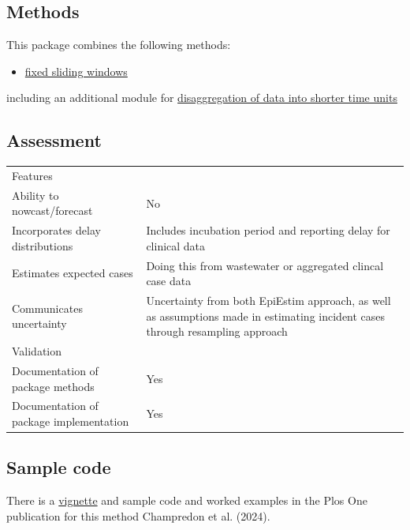 \documentclass[
  letterpaper,
  DIV=11,
  numbers=noendperiod]{scrreprt}
\providecommand{\tightlist}{%
  \setlength{\itemsep}{0pt}\setlength{\parskip}{0pt}}\usepackage{longtable,booktabs,array}
\begin{document}
\subsection*{Methods}\label{methods-10}

This package combines the following methods:

\begin{itemize}
\tightlist
\item
  \hyperref[sec-fixedwindow]{fixed sliding windows}
\end{itemize}

including an additional module for \hyperref[sec-disagg]{disaggregation
of data into shorter time units}

\subsection*{Assessment}\label{assessment-10}

\begin{longtable}[]{@{}
  >{\raggedright\arraybackslash}p{}
  >{\raggedright\arraybackslash}p{}@{}}
\toprule\noalign{}
\endhead
\bottomrule\noalign{}
\endlastfoot
Features & \\
Ability to nowcast/forecast & No \\
Incorporates delay distributions & Includes incubation period and
reporting delay for clinical data \\
Estimates expected cases & Doing this from wastewater or aggregated
clincal case data \\
Communicates uncertainty & Uncertainty from both EpiEstim approach, as
well as assumptions made in estimating incident cases through resampling
approach \\
Validation & \\
Documentation of package methods & Yes \\
Documentation of package implementation & Yes \\
\end{longtable}

\subsection*{Sample code}\label{sample-code-8}

There is a
\href{https://cran.r-project.org/web/packages/ern/vignettes/est-rt.html}{vignette}
and sample code and worked examples in the Plos One publication for this
method Champredon et al. (2024).
\end{document}
